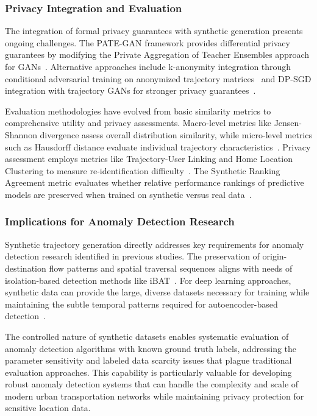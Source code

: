 \documentclass[runningheads]{llncs}
\begin{document}
\subsubsection{Privacy Integration and Evaluation}

The integration of formal privacy guarantees with synthetic generation presents ongoing challenges. The PATE-GAN framework provides differential privacy guarantees by modifying the Private Aggregation of Teacher Ensembles approach for GANs~\cite{jordon2019pate}. Alternative approaches include k-anonymity integration through conditional adversarial training on anonymized trajectory matrices~\cite{rao2023cats} and DP-SGD integration with trajectory GANs for stronger privacy guarantees~\cite{merhi2024synthetic}.

Evaluation methodologies have evolved from basic similarity metrics to comprehensive utility and privacy assessments. Macro-level metrics like Jensen-Shannon divergence assess overall distribution similarity, while micro-level metrics such as Hausdorff distance evaluate individual trajectory characteristics~\cite{kong2023mobility}. Privacy assessment employs metrics like Trajectory-User Linking and Home Location Clustering to measure re-identification difficulty~\cite{rao2023cats}. The Synthetic Ranking Agreement metric evaluates whether relative performance rankings of predictive models are preserved when trained on synthetic versus real data~\cite{jordon2019pate}.

\subsubsection{Implications for Anomaly Detection Research}

Synthetic trajectory generation directly addresses key requirements for anomaly detection research identified in previous studies. The preservation of origin-destination flow patterns and spatial traversal sequences aligns with needs of isolation-based detection methods like iBAT~\cite{zhang2019ibat}. For deep learning approaches, synthetic data can provide the large, diverse datasets necessary for training while maintaining the subtle temporal patterns required for autoencoder-based detection~\cite{huang2021lstm}.

The controlled nature of synthetic datasets enables systematic evaluation of anomaly detection algorithms with known ground truth labels, addressing the parameter sensitivity and labeled data scarcity issues that plague traditional evaluation approaches. This capability is particularly valuable for developing robust anomaly detection systems that can handle the complexity and scale of modern urban transportation networks while maintaining privacy protection for sensitive location data.
\end{document}
